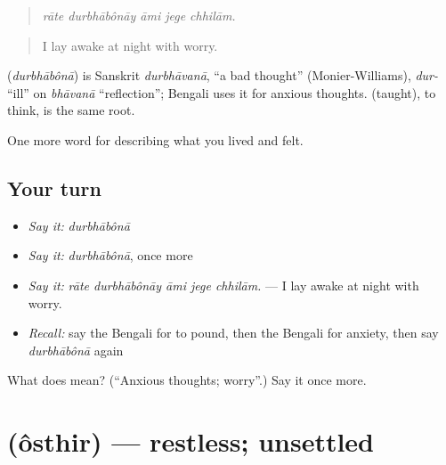 \begin{quote}
\emph{rāte durbhābônāy āmi jege chhilām.}
\end{quote}

\begin{quote}
I lay awake at night with worry.
\end{quote}

\begin{cousinweb}
\textbf{} (\emph{durbhābônā}) is Sanskrit \emph{durbhāvanā}, \textquotedblleft{}a bad thought\textquotedblright{} (Monier-Williams), \emph{dur-} \textquotedblleft{}ill\textquotedblright{} on \emph{bhāvanā} \textquotedblleft{}reflection\textquotedblright{}; Bengali uses it for anxious thoughts.  (taught), to think, is the same root.
\end{cousinweb}

\begin{grammarlens}[title={What you've built}]
One more word for describing what you lived and felt.
\end{grammarlens}

\subsection*{Your turn}
\begin{itemize}
\raggedright
  \item \emph{Say it:} \emph{durbhābônā}
  \item \emph{Say it:} \emph{durbhābônā}, once more
  \item \emph{Say it:} \emph{rāte durbhābônāy āmi jege chhilām.} — I lay awake at night with worry.
  \item \emph{Recall:} say the Bengali for to pound, then the Bengali for anxiety, then say \emph{durbhābônā} again
\end{itemize}

\begin{tcolorbox}[breakable,colback=teal!4,colframe=teal!35!black,title={Before you move on}]
What does  mean? (\textquotedblleft{}Anxious thoughts; worry\textquotedblright{}.) Say it once more.
\end{tcolorbox}
\section[\texorpdfstring{\bn{অস্থির} (ôsthir)}{অস্থির (ôsthir)}]{ (ôsthir) — restless; unsettled}

\label{lesson:BN-C442-osthir}



